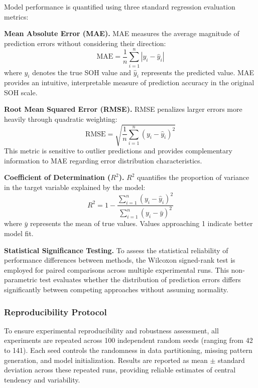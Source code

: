 \documentclass[5p,times]{elsarticle}
\begin{document}
Model performance is quantified using three standard regression evaluation metrics:

\textbf{Mean Absolute Error (MAE).} MAE measures the average magnitude of prediction errors without considering their direction:
\begin{equation}
    \text{MAE} = \frac{1}{n} \sum_{i=1}^{n} |y_i - \hat{y}_i|
\end{equation}
where $y_i$ denotes the true SOH value and $\hat{y}_i$ represents the predicted value. MAE provides an intuitive, interpretable measure of prediction accuracy in the original SOH scale.

\textbf{Root Mean Squared Error (RMSE).} RMSE penalizes larger errors more heavily through quadratic weighting:
\begin{equation}
    \text{RMSE} = \sqrt{\frac{1}{n} \sum_{i=1}^{n} (y_i - \hat{y}_i)^2}
\end{equation}
This metric is sensitive to outlier predictions and provides complementary information to MAE regarding error distribution characteristics.

\textbf{Coefficient of Determination ($R^2$).} $R^2$ quantifies the proportion of variance in the target variable explained by the model:
\begin{equation}
    R^2 = 1 - \frac{\sum_{i=1}^{n} (y_i - \hat{y}_i)^2}{\sum_{i=1}^{n} (y_i - \bar{y})^2}
\end{equation}
where $\bar{y}$ represents the mean of true values. Values approaching 1 indicate better model fit.

\textbf{Statistical Significance Testing.} To assess the statistical reliability of performance differences between methods, the Wilcoxon signed-rank test is employed for paired comparisons across multiple experimental runs. This non-parametric test evaluates whether the distribution of prediction errors differs significantly between competing approaches without assuming normality.

\subsubsection{Reproducibility Protocol}

To ensure experimental reproducibility and robustness assessment, all experiments are repeated across 100 independent random seeds (ranging from 42 to 141). Each seed controls the randomness in data partitioning, missing pattern generation, and model initialization. Results are reported as mean $\pm$ standard deviation across these repeated runs, providing reliable estimates of central tendency and variability.
\end{document}
